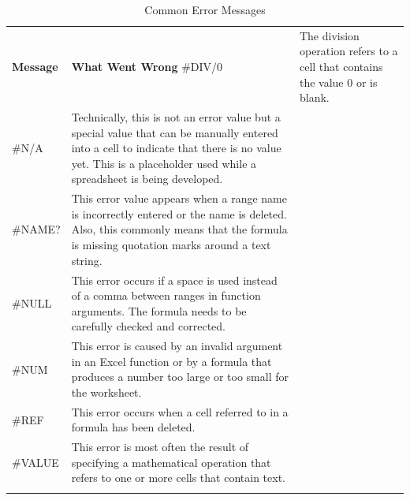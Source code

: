 \begin{table}[H]
	{\small
		\begin{longtable}{L{0.60in}L{3.65in}} %
			\textbf{Message} & \textbf{What Went Wrong} \endhead
			\hline
			\#DIV/$ 0 $ & The division operation refers to a cell that contains the value $ 0 $ or is blank.\\
			\#N/A & Technically, this is not an error value but a special value 		that can be manually entered into a cell to indicate that there is no value yet. This is a placeholder used while a spreadsheet is being developed.\\
			\#NAME? & This error value appears when a range name is incorrectly entered or the name is deleted. Also, this commonly means that the formula is missing quotation marks around a text string.\\
			\#NULL & This error occurs if a space is used instead of a comma between ranges in function arguments. The formula needs to be carefully checked and corrected.\\
			\#NUM & This error is caused by an invalid argument in an Excel	function or by a formula that produces a number too large or too small for the worksheet.\\
			\#REF & This error occurs when a cell referred to in a formula has been deleted.\\
			\#VALUE & This error is most often the result of specifying a mathematical operation that refers to one or more cells that contain text.\\
			\caption{Common Error Messages}
			\label{03:tab01}
		\end{longtable}
	} %
\end{table}

